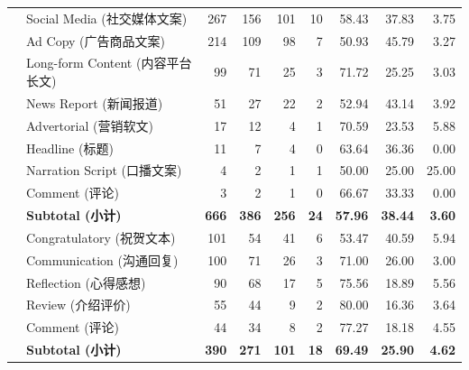 \begin{table}[t]
\begin{tabular}{ll r | rrr rrr}
  & Social Media (社交媒体文案)     & 267 & 156 & 101 & 10 & 58.43 & 37.83 & 3.75 \\
  & Ad Copy (广告商品文案)          & 214 & 109 &  98 &  7 & 50.93 & 45.79 & 3.27 \\
  & Long-form Content (内容平台长文)&  99 &  71 &  25 &  3 & 71.72 & 25.25 & 3.03 \\
  & News Report (新闻报道)          &  51 &  27 &  22 &  2 & 52.94 & 43.14 & 3.92 \\
  & Advertorial (营销软文)          &  17 &  12 &   4 &  1 & 70.59 & 23.53 & 5.88 \\
  & Headline (标题)                 &  11 &   7 &   4 &  0 & 63.64 & 36.36 & 0.00 \\
  & Narration Script (口播文案)     &   4 &   2 &   1 &  1 & 50.00 & 25.00 & 25.00 \\
  & Comment (评论)                  &   3 &   2 &   1 &  0 & 66.67 & 33.33 & 0.00 \\
\cmidrule(lr){2-9}
  & \textbf{Subtotal (小计)} & \textbf{666} & \textbf{386} & \textbf{256} & \textbf{24} & \textbf{57.96} & \textbf{38.44} & \textbf{3.60} \\
\midrule

  & Congratulatory (祝贺文本)       & 101 &  54 &  41 &  6 & 53.47 & 40.59 & 5.94 \\
  & Communication (沟通回复)        & 100 &  71 &  26 &  3 & 71.00 & 26.00 & 3.00 \\
  & Reflection (心得感想)           &  90 &  68 &  17 &  5 & 75.56 & 18.89 & 5.56 \\
  & Review (介绍评价)               &  55 &  44 &   9 &  2 & 80.00 & 16.36 & 3.64 \\
  & Comment (评论)                  &  44 &  34 &   8 &  2 & 77.27 & 18.18 & 4.55 \\
\cmidrule(lr){2-9}
  & \textbf{Subtotal (小计)} & \textbf{390} & \textbf{271} & \textbf{101} & \textbf{18} & \textbf{69.49} & \textbf{25.90} & \textbf{4.62} \\
\midrule


\end{tabular}
\end{table}
